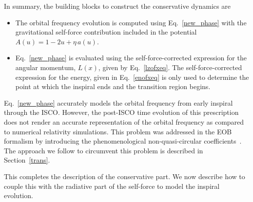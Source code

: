 In summary, the building blocks to construct the conservative dynamics are

\begin{itemize}
\item The orbital frequency evolution is computed using Eq.~\eqref{new_phase} with the gravitational self-force contribution included in the potential \(A(u)= 1-2u + \eta\, a(u)\).
\item Eq.~\eqref{new_phase} is evaluated using the self-force-corrected expression for the angular momentum, \(L(x)\), given by Eq.~\eqref{lzofxeq}. The self-force-corrected expression for the energy, given in Eq.~\eqref{enofxeq} is only used to determine the point at which the inspiral ends and the transition region begins.
\end{itemize}

Eq.~\eqref{new_phase} accurately models the orbital frequency from early 
inspiral through the ISCO. However, the post-ISCO time evolution of this 
prescription does not render an accurate representation of the orbital 
frequency as compared to numerical relativity simulations. 
This problem was addressed in the EOB formalism by introducing the 
phenomenological non-quasi-circular coefficients~\cite{BuonannoEOBv2Main}.
The approach we follow to circumvent this problem is described
in Section~\ref{trans}.

This completes the description of the conservative part. We now describe how to couple this with the radiative part of the self-force to model the inspiral evolution. 
 
